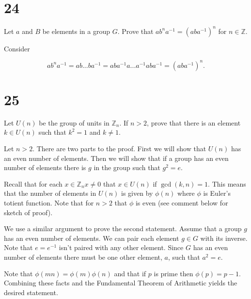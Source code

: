 \documentclass[a4paper]{article}
\begin{document}
\section*{24}

Let $a$ and $B$ be elements in a group $G$. Prove that $ab^na^{-1} = (aba^{-1})^n$ for $n \in \mathbb{Z}$.

\vspace{\baselineskip}

Consider

$$ab^na^{-1} = a b ... b  a^{-1} = a  b a^{-1} a ... a^{-1} a b a^{-1} = (aba^{-1})^n.$$


\section*{25}

Let $U(n)$ be the group of units in $\mathbb{Z}_n$. If $n > 2$, prove that there is an element $k \in U(n)$ such that $k^2 = 1$ and $k \neq 1$.

\vspace{\baselineskip}

Let $n > 2$. There are two parts to the proof. First we will show that $U(n)$ has an even number of elements. Then we will show that if a group has an even number of elements there is $g$ in the group such that $g^2 = e$. 

\vspace{\baselineskip}

Recall that for each $x \in \mathbb{Z}_n x \neq 0$ that $x \in U(n)$ if $\gcd(k,n) = 1$. This means that the number of elements in $U(n)$ is given by $\phi(n)$ where $\phi$ is Euler's totient function. Note that for $n > 2$ that $\phi$ is even (see comment below for sketch of proof).

\vspace{\baselineskip}

We use a similar argument to prove the second statement. Assume that a group $g$ has an even number of elements. We can pair each element $g \in G$ with its inverse. Note that $e = e^{-1}$ isn't paired with any other element. Since $G$ has an even number of elements there must be one other element, $a$, such that $a^2 = e$.

\vspace{\baselineskip}

Note that $\phi(mn) = \phi(m) \phi(n)$ and that if $p$ is prime then $\phi(p) = p-1$. Combining these facts and the Fundamental Theorem of Arithmetic yields the desired statement.
\end{document}
